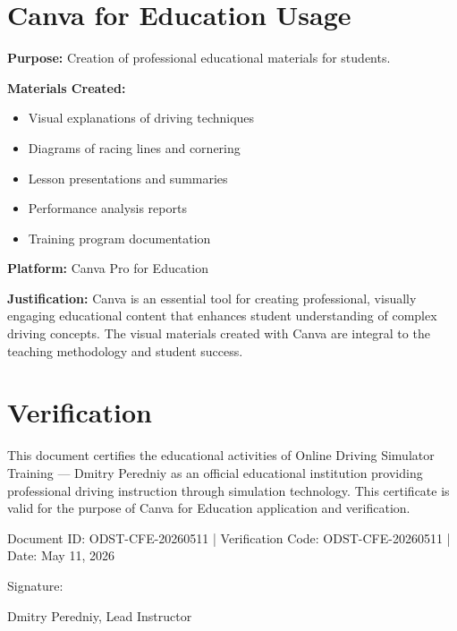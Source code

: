 \documentclass[12pt]{article}
\begin{document}
{\begin{minipage}[c][250mm]{170mm}
\begin{minipage}{\textwidth}
\section*{Canva for Education Usage}
\noindent\textbf{Purpose:} Creation of professional educational materials for students.\par
\vspace{5pt}
\noindent\textbf{Materials Created:}\par
\begin{itemize}[leftmargin=*,noitemsep]
  \item Visual explanations of driving techniques
  \item Diagrams of racing lines and cornering
  \item Lesson presentations and summaries
  \item Performance analysis reports
  \item Training program documentation
\end{itemize}
\noindent\textbf{Platform:} Canva Pro for Education\par
\vspace{5pt}
\noindent\textbf{Justification:} Canva is an essential tool for creating professional, visually engaging educational content that enhances student understanding of complex driving concepts. The visual materials created with Canva are integral to the teaching methodology and student success.\par
\vspace{15pt}

\section*{Verification}
\noindent This document certifies the educational activities of Online Driving Simulator Training — Dmitry Peredniy as an official educational institution providing professional driving instruction through simulation technology. This certificate is valid for the purpose of Canva for Education application and verification.\par

\end{minipage}
\end{minipage}%
}

\vspace{15pt}
\noindent\centering\footnotesize\color{black} Document ID: ODST-CFE-20260511 | Verification Code: ODST-CFE-20260511 | Date: May 11, 2026\par

\vspace{25pt}
\noindent\hfill Signature:\par
\noindent\hfill Dmitry Peredniy, Lead Instructor\par
\end{document}
